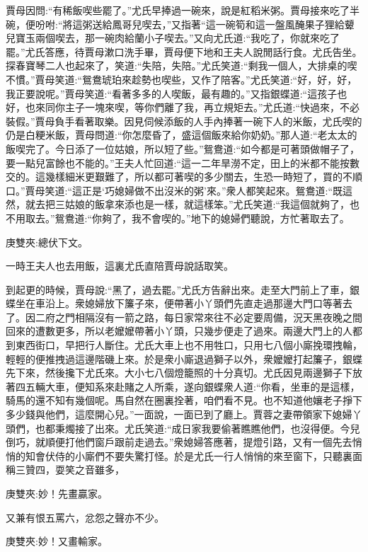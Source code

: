\begin{parag}
    賈母因問:“有稀飯喫些罷了。”尤氏早捧過一碗來，說是紅稻米粥。賈母接來吃了半碗，便吩咐:“將這粥送給鳳哥兒喫去，”又指著“這一碗筍和這一盤風醃果子狸給顰兒寶玉兩個喫去，那一碗肉給蘭小子喫去。”又向尤氏道:“我吃了，你就來吃了罷。”尤氏答應，待賈母漱口洗手畢，賈母便下地和王夫人說閒話行食。尤氏告坐。探春寶琴二人也起來了，笑道:“失陪，失陪。”尤氏笑道:“剩我一個人，大排桌的喫不慣。”賈母笑道:“鴛鴦琥珀來趁勢也喫些，又作了陪客。”尤氏笑道:“好，好，好，我正要說呢。”賈母笑道:“看著多多的人喫飯，最有趣的。”又指銀蝶道:“這孩子也好，也來同你主子一塊來喫，等你們離了我，再立規矩去。”尤氏道:“快過來，不必裝假。”賈母負手看著取樂。因見伺候添飯的人手內捧著一碗下人的米飯，尤氏喫的仍是白粳米飯，賈母問道:“你怎麼昏了，盛這個飯來給你奶奶。”那人道:“老太太的飯喫完了。今日添了一位姑娘，所以短了些。”鴛鴦道:“如今都是可著頭做帽子了，要一點兒富餘也不能的。”王夫人忙回道:“這一二年旱澇不定，田上的米都不能按數交的。這幾樣細米更艱難了，所以都可著喫的多少關去，生恐一時短了，買的不順口。”賈母笑道:“這正是‘巧媳婦做不出沒米的粥’來。”衆人都笑起來。鴛鴦道:“既這然，就去把三姑娘的飯拿來添也是一樣，就這樣笨。”尤氏笑道:“我這個就夠了，也不用取去。”鴛鴦道:“你夠了，我不會喫的。”地下的媳婦們聽說，方忙著取去了。\begin{note}庚雙夾:總伏下文。\end{note}一時王夫人也去用飯，這裏尤氏直陪賈母說話取笑。
\end{parag}


\begin{parag}
    到起更的時候，賈母說:“黑了，過去罷。”尤氏方告辭出來。走至大門前上了車，銀蝶坐在車沿上。衆媳婦放下簾子來，便帶著小丫頭們先直走過那邊大門口等著去了。因二府之門相隔沒有一箭之路，每日家常來往不必定要周備，況天黑夜晚之間回來的遭數更多，所以老嬤嬤帶著小丫頭，只幾步便走了過來。兩邊大門上的人都到東西街口，早把行人斷住。尤氏大車上也不用牲口，只用七八個小廝挽環拽輪，輕輕的便推拽過這邊階磯上來。於是衆小廝退過獅子以外，衆嬤嬤打起簾子，銀蝶先下來，然後攙下尤氏來。大小七八個燈籠照的十分真切。尤氏因見兩邊獅子下放著四五輛大車，便知系來赴賭之人所乘，遂向銀蝶衆人道:“你看，坐車的是這樣，騎馬的還不知有幾個呢。馬自然在圈裏拴著，咱們看不見。也不知道他孃老子掙下多少錢與他們，這麼開心兒。”一面說，一面已到了廳上。賈蓉之妻帶領家下媳婦丫頭們，也都秉燭接了出來。尤氏笑道:“成日家我要偷著瞧瞧他們，也沒得便。今兒倒巧，就順便打他們窗戶跟前走過去。”衆媳婦答應著，提燈引路，又有一個先去悄悄的知會伏侍的小廝們不要失驚打怪。於是尤氏一行人悄悄的來至窗下，只聽裏面稱三贊四，耍笑之音雖多，\begin{note}庚雙夾:妙！先畫贏家。\end{note}又兼有恨五罵六，忿怨之聲亦不少。\begin{note}庚雙夾:妙！又畫輸家。\end{note}
\end{parag}


